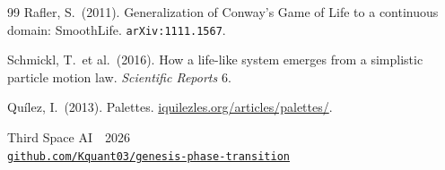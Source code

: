 \documentclass[11pt,a4paper]{article}
\begin{document}
\begin{thebibliography}{99}
Rafler, S.\ (2011).
\newblock Generalization of Conway's Game of Life to a continuous
  domain: SmoothLife. \texttt{arXiv:1111.1567}.

Schmickl, T.\ et al.\ (2016).
\newblock How a life-like system emerges from a simplistic particle
  motion law. \textit{Scientific Reports} 6.

Quílez, I.\ (2013).
\newblock Palettes. \url{iquilezles.org/articles/palettes/}.

\end{thebibliography}

\vspace{18pt}
\begin{center}
\sffamily\footnotesize\color{muted}
Third Space AI \,\textperiodcentered\, 2026\\
\href{https://github.com/Kquant03/genesis-phase-transition}{\texttt{github.com/Kquant03/genesis-phase-transition}}
\end{center}
\end{document}
